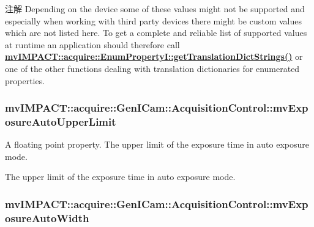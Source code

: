 \begin{DoxyNote}{注解}
Depending on the device some of these values might not be supported and especially when working with third party devices there might be custom values which are not listed here. To get a complete and reliable list of supported values at runtime an application should therefore call {\bfseries \hyperlink{classmv_i_m_p_a_c_t_1_1acquire_1_1_enum_property_i_a0ba6ccbf5ee69784d5d0b537924d26b6}{mv\+I\+M\+P\+A\+C\+T\+::acquire\+::\+Enum\+Property\+I\+::get\+Translation\+Dict\+Strings()}} or one of the other functions dealing with translation dictionaries for enumerated properties. 
\end{DoxyNote}
\hypertarget{classmv_i_m_p_a_c_t_1_1acquire_1_1_gen_i_cam_1_1_acquisition_control_a48663b8c79f8184cb8c8f18fbf3a0e32}{
\subsubsection[{mv\+Exposure\+Auto\+Upper\+Limit}]{ mv\+I\+M\+P\+A\+C\+T\+::acquire\+::\+Gen\+I\+Cam\+::\+Acquisition\+Control\+::mv\+Exposure\+Auto\+Upper\+Limit}}\label{classmv_i_m_p_a_c_t_1_1acquire_1_1_gen_i_cam_1_1_acquisition_control_a48663b8c79f8184cb8c8f18fbf3a0e32}


A floating point property. The upper limit of the exposure time in auto exposure mode. 

The upper limit of the exposure time in auto exposure mode. \hypertarget{classmv_i_m_p_a_c_t_1_1acquire_1_1_gen_i_cam_1_1_acquisition_control_a06d1fcc8caea1f2e40d74865c48b39d2}{
\subsubsection[{mv\+Exposure\+Auto\+Width}]{ mv\+I\+M\+P\+A\+C\+T\+::acquire\+::\+Gen\+I\+Cam\+::\+Acquisition\+Control\+::mv\+Exposure\+Auto\+Width}}\label{classmv_i_m_p_a_c_t_1_1acquire_1_1_gen_i_cam_1_1_acquisition_control_a06d1fcc8caea1f2e40d74865c48b39d2}


